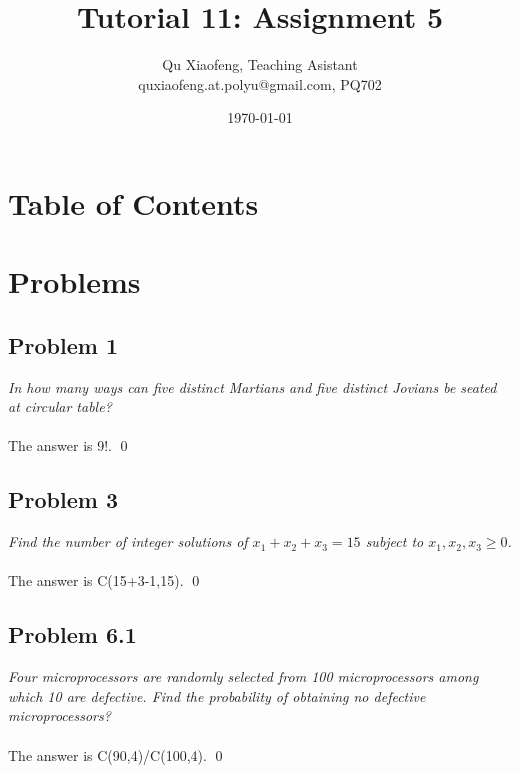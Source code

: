 \documentclass[
        ]{beamer}
\title[Tutorial 11]{Tutorial 11: Assignment 5}
\author[COMP210]{Qu Xiaofeng\texorpdfstring{, Teaching Asistant\\\tiny{quxiaofeng.at.polyu@gmail.com, PQ702}}{}}
\institute{COMP210\\Discrete Structure}
\date{\today}
\begin{document}
\frame{\titlepage}

\section*{Table of Contents}

    \begin{frame}[shrink]{\secname}
        \tableofcontents
    \end{frame}




\section{Problems}
    \subsection{Problem 1}    
        \begin{frame}[c]{\subsecname}
            \emph{In how many ways can five distinct Martians and five distinct Jovians be seated at circular table?}\\$\;$\\\pause
            The answer is 9!. \qed
        \end{frame}



    \subsection{Problem 3}
        \begin{frame}[c]{\subsecname}
            \emph{Find the number of integer solutions of $x_1 + x_2 + x_3 = 15$ subject to $ x_1, x_2, x_3 \geq 0$.}\\$\;$\\\pause
            The answer is C(15+3-1,15). \qed
        \end{frame}



    \subsection{Problem 6.1}
        \begin{frame}[c]{\subsecname}
            \emph{Four microprocessors are randomly selected from 100 microprocessors among which 10 are defective. Find the probability of obtaining no defective microprocessors?} \\$\;$\\ \pause
            The answer is C(90,4)/C(100,4). \qed
        \end{frame}
\end{document}
